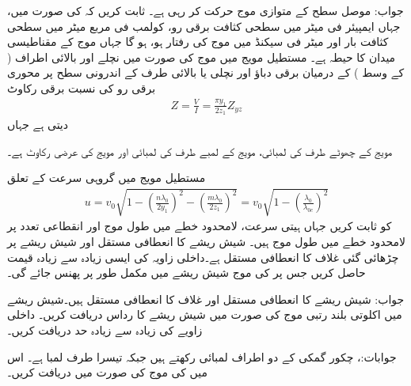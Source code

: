 جواب: 
موصل سطح کے متوازی  موج حرکت کر رہی ہے۔ ثابت کریں کہ  کی صورت میں، جہاں  ایمپیئر فی میٹر میں سطحی کثافت برقی رو،  کولمب فی مربع میٹر میں سطحی کثافت بار اور  میٹر فی سیکنڈ میں موج کی رفتار ہو،  ہو گا جہاں  موج کے مقناطیسی میدان  کا حیطہ ہے۔
مستطیل مویج میں  موج کی صورت میں نچلے اور بالائی اطراف ( کے وسط ) کے درمیان برقی دباؤ  اور نچلی یا بالائی طرف کے اندرونی سطح پر محوری برقی رو  کی  نسبت  برقی رکاوٹ  
\begin{align}
Z=\frac{V}{I}=\frac{\pi y_1}{2 z_1} Z_{yz}
\end{align}
دیتی ہے جہاں
\begin{description}
 مویج کے چھوٹے طرف کی لمبائی،
 مویج کے لمبے طرف کی لمبائی اور
 مویج کی عرضی رکاوٹ ہے۔
\end{description}
مستطیل مویج میں گروہی سرعت  کے تعلق
\begin{align}
u=v_0 \sqrt{1-\left(\frac{n \lambda_0}{2 y_1}\right)^2-\left(\frac{m \lambda_0}{2 z_1}\right)^2}=v_0 \sqrt{1-\left(\frac{\lambda_0}{\lambda_{0c}}\right)^2}
\end{align}
کو ثابت کریں جہاں  ہیتی سرعت،  لامحدود خطے میں طول موج اور  انقطاعی تعدد پر لامحدود خطے میں طول موج ہیں۔
شیش ریشے کا  انعطافی مستقل  اور شیش ریشے پر چڑھائی گئی غلاف کا  انعطافی مستقل  ہے۔داخلی زاویہ  کی ایسی زیادہ سے زیادہ قیمت حاصل کریں جس پر  کی موج شیش ریشے میں مکمل طور پر پھنس جائے گی۔

جواب: 
شیش ریشے کا  انعطافی مستقل  اور غلاف کا  انعطافی مستقل  ہیں۔شیش ریشے میں اکلوتی  بلند رتبی موج کی صورت میں شیش ریشے کا رداس دریافت کریں۔ داخلی زاویے کی زیادہ سے زیادہ حد دریافت کریں۔

جوابات:، 
چکور گمکی کے دو اطراف  لمبائی رکھتے ہیں جبکہ تیسرا طرف  لمبا ہے۔ اس میں  کی  موج کی صورت میں  دریافت کریں۔

